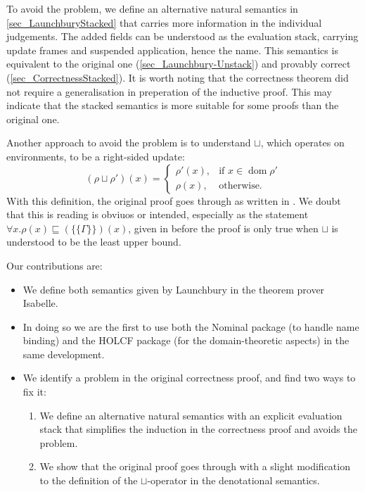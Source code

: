 \documentclass[11pt,a4paper,parskip=half]{scrartcl}
\begin{document}
To avoid the problem, we define an alternative natural semantics in \ref{sec_LaunchburyStacked} that carries more information in the individual judgements. The added fields can be understood as the evaluation stack, carrying update frames and suspended application, hence the name. This semantics is equivalent to the original one (\ref{sec_Launchbury-Unstack}) and provably correct (\ref{sec_CorrectnessStacked}). It is worth noting that the correctness theorem did not require a generalisation in preperation of the inductive proof. This may indicate that the stacked semantics is more suitable for some proofs than the original one.

Another approach to avoid the problem is to understand $\sqcup$, which operates on environments, to be a right-sided update:
\[
(\rho \sqcup \rho')(x) = 
\begin{cases}
\rho'(x), &\text{if } x \in \operatorname{dom} \rho' \\
\rho(x), &\text{otherwise.}
\end{cases}
\]
With this definition, the original proof goes through as written in \cite{launchbury}. We doubt that this is reading is obviuos or intended, especially as the statement $\forall x. \rho(x) \sqsubseteq (\{\!\!\{\Gamma\}\!\!\})(x)$, given in \cite{launchbury} before the proof is only true when $\sqcup$ is understood to be the least upper bound.

Our contributions are:
 
\begin{itemize}
\item We define both semantics given by Launchbury in the theorem prover Isabelle.
\item In doing so we are the first to use both the Nominal package (to handle name binding) and the HOLCF package (for the domain-theoretic aspects) in the same development.
\item We identify a problem in the original correctness proof, and find two ways to fix it:
\begin{enumerate}
\item We define an alternative natural semantics with an explicit evaluation stack that simplifies the induction in the correctness proof and avoids the problem.
\item We show that the original proof goes through with a slight modification to the definition of the $\sqcup$-operator in the denotational semantics.
\end{enumerate}
\end{itemize}
\end{document}
